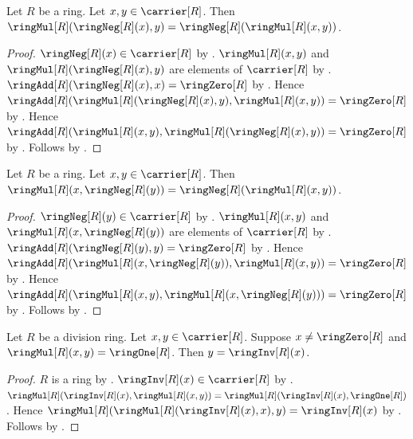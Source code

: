 \begin{theorem}\label{ring_neg_product_left}
    Let $R$ be a ring.
    Let $x,y\in\carrier[R]$.
    Then
        $\ringMul[R](\ringNeg[R](x),y)
            =\ringNeg[R](\ringMul[R](x,y))$.
\end{theorem}
\begin{proof}
    $\ringNeg[R](x)\in\carrier[R]$ by .
    $\ringMul[R](x,y)$ and
        $\ringMul[R](\ringNeg[R](x),y)$ are elements of $\carrier[R]$
        by .
    $\ringAdd[R](\ringNeg[R](x),x)=\ringZero[R]$
        by .
    Hence
    $\ringAdd[R]
        (\ringMul[R](\ringNeg[R](x),y),\ringMul[R](x,y))
        =\ringZero[R]$
        by .
    Hence
    $\ringAdd[R]
        (\ringMul[R](x,y),\ringMul[R](\ringNeg[R](x),y))
        =\ringZero[R]$
        by .
    Follows by .
\end{proof}

\begin{theorem}\label{ring_neg_product_right}
    Let $R$ be a ring.
    Let $x,y\in\carrier[R]$.
    Then
        $\ringMul[R](x,\ringNeg[R](y))
            =\ringNeg[R](\ringMul[R](x,y))$.
\end{theorem}
\begin{proof}
    $\ringNeg[R](y)\in\carrier[R]$ by .
    $\ringMul[R](x,y)$ and
        $\ringMul[R](x,\ringNeg[R](y))$ are elements of $\carrier[R]$
        by .
    $\ringAdd[R](\ringNeg[R](y),y)=\ringZero[R]$
        by .
    Hence
    $\ringAdd[R]
        (\ringMul[R](x,\ringNeg[R](y)),\ringMul[R](x,y))
        =\ringZero[R]$
        by .
    Hence
    $\ringAdd[R]
        (\ringMul[R](x,y),\ringMul[R](x,\ringNeg[R](y)))
        =\ringZero[R]$
        by .
    Follows by .
\end{proof}

\begin{theorem}\label{division_ring_inverse_unique}
    Let $R$ be a division ring.
    Let $x,y\in\carrier[R]$.
    Suppose $x\neq\ringZero[R]$ and
        $\ringMul[R](x,y)=\ringOne[R]$.
    Then $y=\ringInv[R](x)$.
\end{theorem}
\begin{proof}
    $R$ is a ring by .
    $\ringInv[R](x)\in\carrier[R]$
        by .
    $\ringMul[R](\ringInv[R](x),
        \ringMul[R](x,y))
        =\ringMul[R](\ringInv[R](x),\ringOne[R])$.
    Hence
    $\ringMul[R](
        \ringMul[R](\ringInv[R](x),x),y)
        =\ringInv[R](x)$
        by .
    Follows by
        .
\end{proof}

